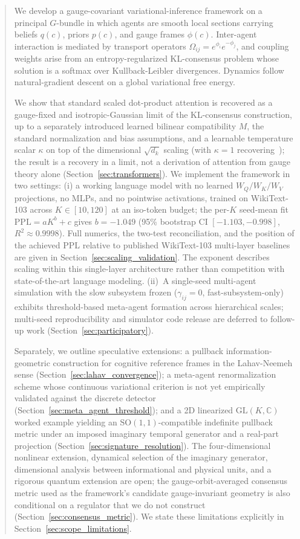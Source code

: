 \documentclass[11pt]{article}
\begin{document}
\begin{abstract}
We develop a gauge-covariant variational-inference framework on a principal $G$-bundle in which agents are smooth local sections carrying beliefs $q(c)$, priors $p(c)$, and gauge frames $\phi(c)$. Inter-agent interaction is mediated by transport operators $\Omega_{ij} = e^{\phi_i} e^{-\phi_j}$, and coupling weights arise from an entropy-regularized KL-consensus problem whose solution is a softmax over Kullback-Leibler divergences. Dynamics follow natural-gradient descent on a global variational free energy.

We show that standard scaled dot-product attention is recovered as a gauge-fixed and isotropic-Gaussian limit of the KL-consensus construction, up to a separately introduced learned bilinear compatibility $M$, the standard normalization and bias assumptions, and a learnable temperature scalar $\kappa$ on top of the dimensional $\sqrt{d_k}$ scaling (with $\kappa = 1$ recovering~\cite{vaswani2017attention}); the result is a recovery in a limit, not a derivation of attention from gauge theory alone (Section~\ref{sec:transformers}). We implement the framework in two settings: (i) a working language model with no learned $W_Q/W_K/W_V$ projections, no MLPs, and no pointwise activations, trained on WikiText-103 across $K \in [10,120]$ at an iso-token budget; the per-$K$ seed-mean fit $\mathrm{PPL} = aK^b + c$ gives $b = -1.049$ (95\% bootstrap CI $[-1.103, -0.998]$, $R^2 \approx 0.9998$). Full numerics, the two-test reconciliation, and the position of the achieved PPL relative to published WikiText-103 multi-layer baselines are given in Section~\ref{sec:scaling_validation}. The exponent describes scaling within this single-layer architecture rather than competition with state-of-the-art language modeling. (ii)~A single-seed multi-agent simulation with the slow subsystem frozen ($\gamma_{ij} = 0$, fast-subsystem-only) exhibits threshold-based meta-agent formation across hierarchical scales; multi-seed reproducibility and simulator code release are deferred to follow-up work (Section~\ref{sec:participatory}).

Separately, we outline speculative extensions: a pullback information-geometric construction for cognitive reference frames in the Lahav-Neemeh sense (Section~\ref{sec:lahav_convergence}); a meta-agent renormalization scheme whose continuous variational criterion is not yet empirically validated against the discrete detector (Section~\ref{sec:meta_agent_threshold}); and a 2D linearized $\mathrm{GL}(K, \mathbb{C})$ worked example yielding an $\mathrm{SO}(1,1)$-compatible indefinite pullback metric under an imposed imaginary temporal generator and a real-part projection (Section~\ref{sec:signature_resolution}). The four-dimensional nonlinear extension, dynamical selection of the imaginary generator, dimensional analysis between informational and physical units, and a rigorous quantum extension are open; the gauge-orbit-averaged consensus metric used as the framework's candidate gauge-invariant geometry is also conditional on a regulator that we do not construct (Section~\ref{sec:consensus_metric}). We state these limitations explicitly in Section~\ref{sec:scope_limitations}.
\end{abstract}
\end{document}
